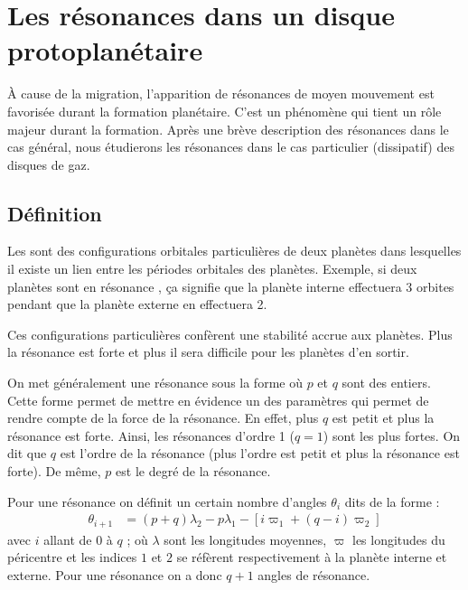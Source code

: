 \section{Les résonances dans un disque protoplanétaire}
À cause de la migration, l'apparition de résonances de moyen mouvement est favorisée durant la formation planétaire. C'est un phénomène qui tient un rôle majeur durant la formation. Après une brève description des résonances dans le cas général, nous étudierons les résonances dans le cas particulier (dissipatif) des disques de gaz. 

\subsection{Définition}
Les  sont des configurations orbitales particulières de deux planètes
dans lesquelles il existe un lien entre les périodes orbitales des planètes. Exemple, si deux planètes sont en résonance
, ça signifie que la planète interne effectuera 3 orbites pendant que la planète externe en effectuera 2.

Ces configurations particulières confèrent une stabilité accrue aux planètes. Plus la résonance est forte et plus il sera
difficile pour les planètes d'en sortir.

\bigskip

On met généralement une résonance sous la forme  où $p$ et $q$ sont des entiers. Cette forme permet de mettre en
évidence un des paramètres qui permet de rendre compte de la force de la résonance. En effet, plus $q$ est petit et plus la
résonance est forte. Ainsi, les résonances d'ordre 1 ($q=1$) sont les plus fortes. On dit que $q$ est l'ordre de la résonance
(plus l'ordre est petit et plus la résonance est forte). De même, $p$ est le degré de la résonance.

Pour une résonance  on définit un certain nombre d'angles $\theta_i$ dits  de la forme :
\begin{align}
\theta_{i+1} &=(p+q)\lambda_2 -p\lambda_1 - \left[i\varpi_{1} + (q-i)\varpi_2\right]
\end{align}
avec $i$ allant de $0$ à $q$ ; où $\lambda$ sont les longitudes moyennes, $\varpi$ les longitudes du péricentre et les indices
$1$ et $2$ se réfèrent respectivement à la planète interne et externe. Pour une résonance  on a donc $q+1$ angles
de résonance.

